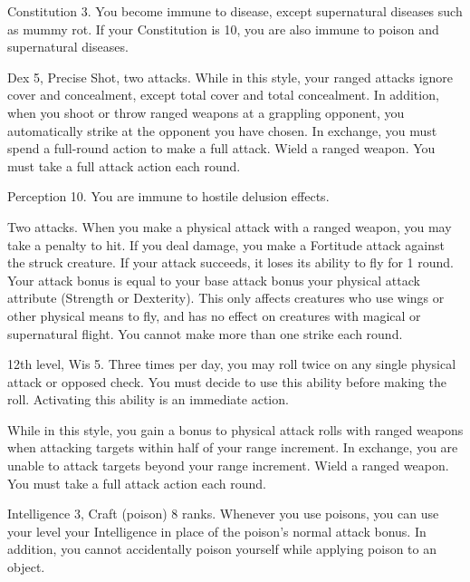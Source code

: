 \featpre Constitution 3.
\featben You become immune to disease, except supernatural diseases such as mummy rot.
If your Constitution is 10, you are also immune to poison and supernatural diseases.

\featpres
Dex 5, Precise Shot, two attacks.
\featben While in this style, your ranged attacks ignore cover and concealment, except total cover and total concealment.
In addition, when you shoot or throw ranged weapons at a grappling opponent, you automatically strike at the opponent you have chosen.
In exchange, you must spend a full-round action to make a full attack.
\stylereq Wield a ranged weapon.
You must take a full attack action each round.

\featpre Perception 10.
\featben You are immune to hostile delusion effects.

\featpre Two attacks.
\featben When you make a physical attack with a ranged weapon, you may take a  penalty to hit.
If you deal damage, you make a Fortitude attack against the struck creature.
If your attack succeeds, it loses its ability to fly for 1 round.
Your attack bonus is equal to your base attack bonus \add your physical attack attribute (Strength or Dexterity).
This only affects creatures who use wings or other physical means to fly, and has no effect on creatures with magical or supernatural flight.
You cannot make more than one strike each round.

\featpre 12th level, Wis 5.
\featben Three times per day, you may roll twice on any single physical attack or opposed check.
You must decide to use this ability before making the roll.
Activating this ability is an immediate action.

\featben While in this style, you gain a  bonus to physical attack rolls with ranged weapons when attacking targets within half of your range increment.
In exchange, you are unable to attack targets beyond your range increment.
\stylereq Wield a ranged weapon.
You must take a full attack action each round.

\featpre Intelligence 3, Craft (poison) 8 ranks.
\featben Whenever you use poisons, you can use your level \add your Intelligence in place of the poison's normal attack bonus.
In addition, you cannot accidentally poison yourself while applying poison to an object.

